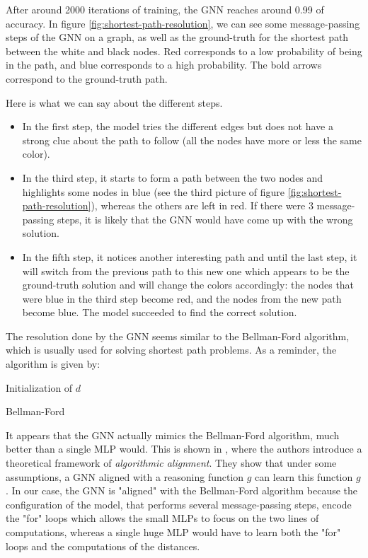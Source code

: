 \documentclass{article}
\begin{document}
After around 2000 iterations of training, the GNN reaches around 0.99 of accuracy. In figure \ref{fig:shortest-path-resolution}, we can see some message-passing steps of the GNN on a graph, as well as the ground-truth for the shortest path between the white and black nodes. Red corresponds to a low probability of being in the path, and blue corresponds to a high probability. The bold arrows correspond to the ground-truth path.

Here is what we can say about the different steps. 
\begin{itemize}
    \item In the first step, the model tries the different edges but does not have a strong clue about the path to follow (all the nodes have more or less the same color).
    
    \item In the third step, it starts to form a path between the two nodes and highlights some nodes in blue (see the third picture of figure \ref{fig:shortest-path-resolution}), whereas the others are left in red. If there were 3 message-passing steps, it is likely that the GNN would have come up with the wrong solution. 
    
    \item In the fifth step, it notices another interesting path and until the last step, it will switch from the previous path to this new one which appears to be the ground-truth solution and will change the colors accordingly: the nodes that were blue in the third step become red, and the nodes from the new path become blue. The model succeeded to find the correct solution.
\end{itemize}

The resolution done by the GNN seems similar to the Bellman-Ford algorithm, which is usually used for solving shortest path problems. As a reminder, the algorithm is given by:

\begin{algorithm}[H]
\SetAlgoLined
{}
 Initialization of $d$ \\
 \caption{Bellman-Ford}
\end{algorithm}

It appears that the GNN actually mimics the Bellman-Ford algorithm, much better than a single MLP would. This is shown in \cite{xu2019neural}, where the authors introduce a theoretical framework of \emph{algorithmic alignment}. They show that under some assumptions, a GNN aligned with a reasoning function $g$ can learn this function $g$. In our case, the GNN is "aligned" with the Bellman-Ford algorithm because the configuration of the model, that performs several message-passing steps, encode the "for" loops which allows the small MLPs to focus on the two lines of computations, whereas a single huge MLP would have to learn both the "for" loops and the computations of the distances.
\end{document}
